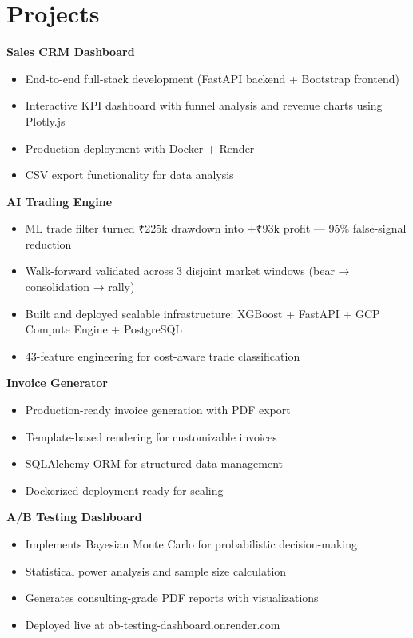 \documentclass[11pt,a4paper]{article}
\begin{document}
\section*{Projects}
\noindent\textbf{Sales CRM Dashboard} \hfill \href{https://sales-dashboard-x5nm.onrender.com}{\faGlobe} \href{https://github.com/jiyanshusingh/sales_dashboard}{\faGithub}
\begin{itemize}
    \item End-to-end full-stack development (FastAPI backend + Bootstrap frontend)
    \item Interactive KPI dashboard with funnel analysis and revenue charts using Plotly.js
    \item Production deployment with Docker + Render
    \item CSV export functionality for data analysis
\end{itemize}

\noindent\textbf{AI Trading Engine} \hfill \href{https://github.com/jiyanshusingh/trading-engine}{\faGithub}
\begin{itemize}
    \item ML trade filter turned ₹225k drawdown into +₹93k profit — 95\% false-signal reduction
    \item Walk-forward validated across 3 disjoint market windows (bear → consolidation → rally)
    \item Built and deployed scalable infrastructure: XGBoost + FastAPI + GCP Compute Engine + PostgreSQL
    \item 43-feature engineering for cost-aware trade classification
\end{itemize}

\noindent\textbf{Invoice Generator} \hfill \href{https://github.com/jiyanshusingh/invoice-generator}{\faGithub}
\begin{itemize}
    \item Production-ready invoice generation with PDF export
    \item Template-based rendering for customizable invoices
    \item SQLAlchemy ORM for structured data management
    \item Dockerized deployment ready for scaling
\end{itemize}

\noindent\textbf{A/B Testing Dashboard} \hfill \href{https://ab-testing-dashboard.onrender.com}{\faGlobe} \href{https://github.com/jiyanshusingh/ab-testing-dashboard}{\faGithub}
\begin{itemize}
    \item Implements Bayesian Monte Carlo for probabilistic decision-making
    \item Statistical power analysis and sample size calculation
    \item Generates consulting-grade PDF reports with visualizations
    \item Deployed live at ab-testing-dashboard.onrender.com
\end{itemize}
\end{document}
